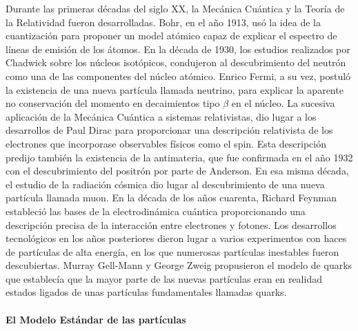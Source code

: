 Durante las primeras décadas del siglo XX, la Mecánica Cuántica y la Teoría de la Relatividad fueron desarrolladas. Bohr, en el año 1913, usó la idea de la cuantización para proponer un model atómico capaz de explicar el espectro de líneas de emisión de los átomos. En la década de 1930, los estudios realizados por Chadwick sobre los núcleos isotópicos, condujeron al descubrimiento del neutrón como una de las componentes del núcleo atómico. Enrico Fermi, a su vez, postuló la existencia de una nueva partícula llamada neutrino, para explicar la aparente no conservación del momento en decaimientos tipo $\beta$ en el núcleo. La sucesiva aplicación de la Mecánica Cuántica a sistemas relativistas, dio lugar a los desarrollos de Paul Dirac para proporcionar una descripción relativista de los electrones que incorporase observables físicos como el spin. Esta descripción predijo también la existencia de la antimateria, que fue confirmada en el año 1932 con el descubrimiento del positrón por parte de Anderson. En esa misma década, el estudio de la radiación cósmica dio lugar al descubrimiento de una nueva partícula llamada muon. En la década de los años cuarenta, Richard Feynman estableció las bases de la electrodinámica cuántica proporcionando una descripción precisa de la interacción entre electrones y fotones. Los desarrollos tecnológicos en los años posteriores dieron lugar a varios experimentos con haces de partículas de alta energía, en los que numerosas partículas inestables fueron descubiertas. Murray Gell-Mann y George Zweig propusieron el modelo de quarks que establecía que la mayor parte de las nuevas partículas eran en realidad estados ligados de unas partículas fundamentales llamadas quarks. 

\paragraph{El Modelo Estándar de las partículas\\\\}


